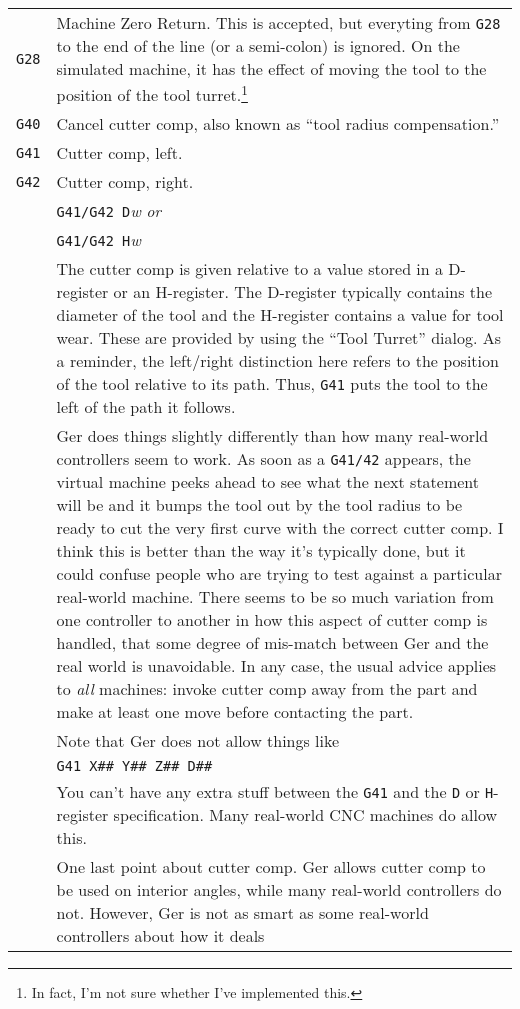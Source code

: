 \documentclass[titlepage,oneside,10pt]{article}
\begin{document}
\begin{longtable}{lp{10cm}}
{\tt G28}&Machine Zero Return. This is accepted, but everyting from
{\tt G28} to the end of the line (or a semi-colon) is ignored. On the
simulated machine, it has the effect of moving the tool to the
position of the tool turret.\footnote{In fact, I'm not sure whether
  I've implemented this.}\\
{\tt G40}&Cancel cutter comp, also known as ``tool radius compensation.''\\
{\tt G41}&Cutter comp, left.\\
{\tt G42}&Cutter comp, right. \\
&{\tt G41/G42 D}\emph{w} \emph{or}\\
&{\tt G41/G42 H}\emph{w} \\
& The cutter comp is given relative to a value stored in a
D-register or an H-register. The D-register typically contains the
diameter of the tool and the H-register contains a value for tool
wear. These are provided by using the ``Tool Turret'' dialog. As a
reminder, the left/right distinction here refers to the 
position of the tool relative to its path. Thus, {\tt G41} puts the
tool to the left of the path it follows.\\
&Ger does things slightly differently than how many real-world
controllers seem to work. As soon as a {\tt G41/42} appears, the
virtual machine peeks ahead to see what the next statement will be and
it bumps the tool out by the tool radius to be ready to cut the very
first curve with the correct cutter comp. I think this is better than the way
it's typically done, but it could confuse people who are trying to
test against a particular real-world machine. There seems to
be so much variation from one controller to another in how this aspect of
cutter comp is handled, that some degree of mis-match between Ger and
the real world is unavoidable. In any case, the usual advice applies
to \emph{all} machines: invoke cutter comp away from the part and make
at least one move before contacting the part. \\
& Note that Ger does not allow things like\\
& {\tt G41 X\#\# Y\#\# Z\#\# D\#\#}\\
& You can't have any extra stuff between the {\tt G41} and the {\tt D}
or {\tt H}-register specification. Many real-world CNC machines do
allow this.\\
& One last point about cutter comp. Ger allows cutter comp to be used
on interior angles, while many real-world controllers do not. However,
Ger is not as smart as some real-world controllers about how it deals

\end{longtable}
\end{document}
